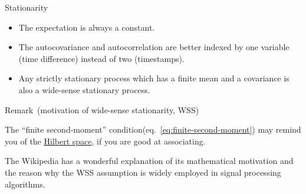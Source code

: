 \documentclass[utf-8, 10pt, aspectratio=1610]{beamer}
\begin{document}
\begin{frame}[allowframebreaks]{Stationarity}
	\framebreak
	\vspace*{\fill}
	\begin{corollary}
		\begin{itemize}
			\item The expectation is always a constant.
			\item The autocovariance and autocorrelation are better indexed by one variable (time difference) instead of two (timestamps).
			\item Any strictly stationary process which has a finite mean and a covariance is also a wide-sense stationary process.
		\end{itemize}
	\end{corollary}
	\vspace*{\fill}

	\framebreak
	\vspace*{\fill}
	\begin{block}{Remark\ (motivation of wide-sense stationarity, WSS)}
		\par The ``finite second-moment'' condition(eq.~\ref{eq:finite-second-moment}) may remind you of the \href{https://en.wikipedia.org/wiki/Hilbert_space}{Hilbert space}, if you are good at associating.
		\par The Wikipedia \cite{enwiki:1166251052} has a wonderful explanation of its mathematical motivation and the reason why the WSS assumption is widely employed in signal processing algorithms.
	\end{block}
	\vspace*{\fill}
\end{frame}
\end{document}

